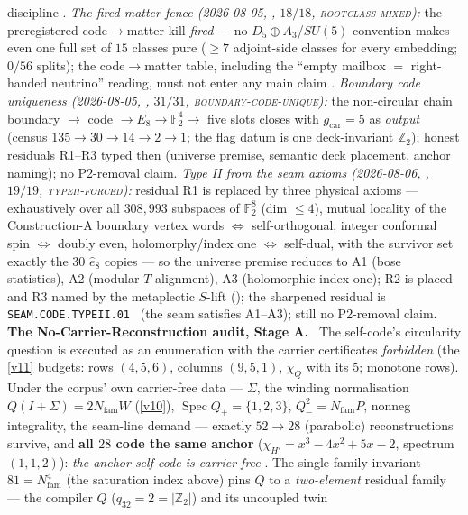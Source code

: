 \documentclass[11pt,a4paper]{article}
\newcommand{\gcar}{g_{\mathrm{car}}}
\newcommand{\Nfam}{N_{\mathrm{fam}}}
\newcommand{\Z}{\mathbb{Z}}
\theoremstyle{definition}
\begin{document}
\begin{winbox}
discipline \mE.  \emph{The fired matter fence (2026-08-05,
, $18/18$,
\textsc{rootclass-mixed}):} the preregistered code$\to$matter kill
\emph{fired} --- no $D_5{\oplus}A_3$/$SU(5)$ convention makes even
one full set of $15$ classes pure ($\ge7$ adjoint-side classes for
every embedding; $0/56$ splits); the code$\to$matter table,
including the ``empty mailbox $=$ right-handed neutrino'' reading,
must not enter any main claim \mE.  \emph{Boundary code uniqueness
(2026-08-05, ,
$31/31$, \textsc{boundary-code-unique}):} the non-circular chain
boundary $\to$ code $\to E_8\to\mathbb F_2^4\to$ five slots closes
with $\gcar=5$ as \emph{output} (census $135\to30\to14\to2\to1$;
the flag datum is one deck-invariant $\Z_2$); honest residuals
R1--R3 typed then (universe premise, semantic deck placement,
anchor naming); no P2-removal claim.  \emph{Type II from the seam
axioms (2026-08-06, , $19/19$,
\textsc{typeii-forced}):} residual R1 is replaced by three physical
axioms --- exhaustively over all $308{,}993$ subspaces of
$\mathbb F_2^8$ (dim $\le4$), mutual locality of the
Construction-A boundary vertex words $\iff$ self-orthogonal,
integer conformal spin $\iff$ doubly even, holomorphy/index one
$\iff$ self-dual, with the survivor set exactly the $30$
$\hat e_8$ copies --- so the universe premise reduces to A1 (bose
statistics), A2 (modular $T$-alignment), A3 (holomorphic index
one); R2 is placed and R3 named by the metaplectic $S$-lift
(); the sharpened
residual is \texttt{SEAM.CODE.TYPEII.01} \mC\ (the seam satisfies
A1--A3); still no P2-removal claim.
\noindent\textbf{The No-Carrier-Reconstruction audit, Stage A.}
\ The self-code's circularity question is
executed as an enumeration with the carrier certificates \emph{forbidden} (the \vref{v11} budgets:
rows $(4,5,6)$, columns $(9,5,1)$, $\chi_Q$ with its $5$; monotone rows).  Under the corpus' own
carrier-free data --- $\Sigma$, the winding normalisation $Q(I{+}\Sigma)=2\Nfam W$ (\vref{v10}),
$\operatorname{Spec}Q_+=\{1,2,3\}$, $Q_-^2=\Nfam P$, nonneg integrality, the seam-line demand ---
exactly $52\to28$ (parabolic) reconstructions survive, and \textbf{all $28$ code the same anchor}
($\chi_{H'}=x^3-4x^2+5x-2$, spectrum $(1,1,2)$): \emph{the anchor self-code is carrier-free} \mE.
The single family invariant $81=\Nfam^4$ (the saturation index above) pins $Q$ to a
\emph{two-element} residual family --- the compiler $Q$ ($q_{32}=2=|\Z_2|$) and its uncoupled twin

\end{winbox}
\end{document}
